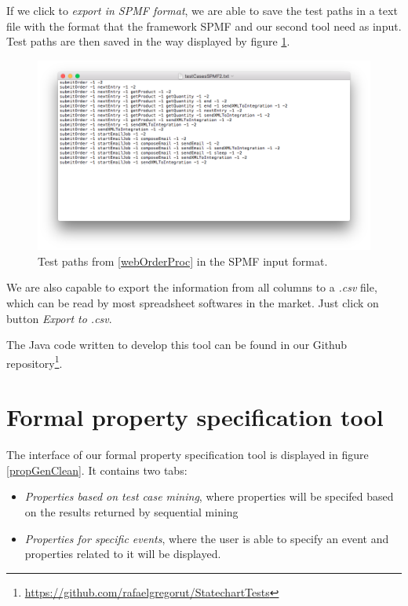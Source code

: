 If we click to \textit{export in SPMF format}, we are able to save the test paths in a text file with the format that the framework SPMF and our second tool need as input. Test paths are then saved in the way displayed by figure \ref{resultsSPMFFile}.

\begin{figure}[htb]
\centering
\includegraphics[width=\textwidth]{figuras/resultsSPMFFile}
\caption{\label{resultsSPMFFile} Test paths from \ref{webOrderProc} in the SPMF input format.}
\end{figure}

We are also capable to export the information from all columns to a \textit{.csv} file, which can be read by most spreadsheet softwares in the market. Just click on button \textit{Export to .csv}.

The Java code written to develop this tool can be found in our Github repository\footnote{\url{https://github.com/rafaelgregorut/StatechartTests}}.

\section{Formal property specification tool}

The interface of our formal property specification tool is displayed in figure \ref{propGenClean}. It contains two tabs: 
\begin{itemize}
\item \textit{Properties based on test case mining}, where properties will be specifed based on the results returned by sequential mining
\item \textit{Properties for specific events}, where the user is able to specify an event and properties related to it will be displayed.
\end{itemize}

